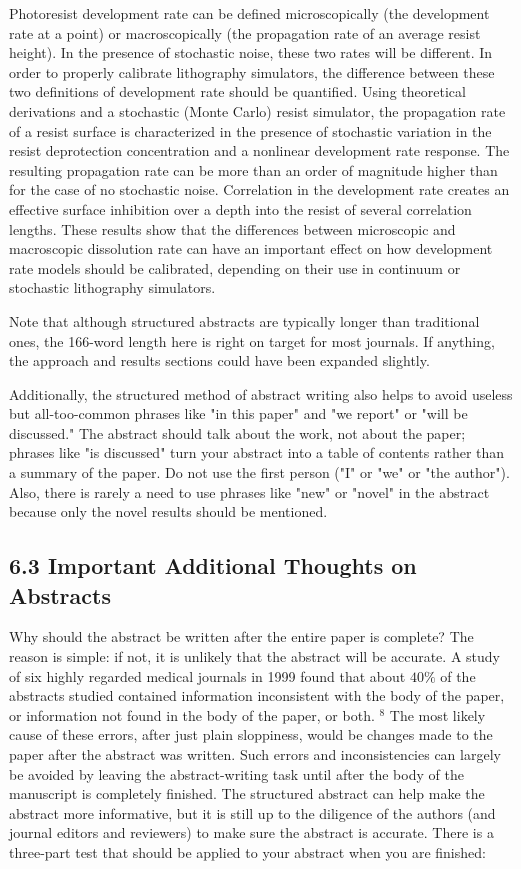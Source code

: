Photoresist development rate can be defined microscopically (the development rate at a point) or macroscopically (the propagation rate of an average resist height). In the presence of stochastic noise, these two rates will be different. In order to properly calibrate lithography simulators, the difference between these two definitions of development rate should be quantified. Using theoretical derivations and a stochastic (Monte Carlo) resist simulator, the propagation rate of a resist surface is characterized in the presence of stochastic variation in the resist deprotection concentration and a nonlinear development rate response. The resulting propagation rate can be more than an order of magnitude higher than for the case of no stochastic noise. Correlation in the development rate creates an effective surface inhibition over a depth into the resist of several correlation lengths. These results show that the differences between microscopic and macroscopic dissolution rate can have an important effect on how development rate models should be calibrated, depending on their use in continuum or stochastic lithography simulators.

Note that although structured abstracts are typically longer than traditional ones, the 166-word length here is right on target for most journals. If anything, the approach and results sections could have been expanded slightly.

Additionally, the structured method of abstract writing also helps to avoid useless but all-too-common phrases like "in this paper" and "we report" or "will be discussed." The abstract should talk about the work, not about the paper; phrases like "is discussed" turn your abstract into a table of contents rather than a summary of the paper. Do not use the first person ("I" or "we" or "the author"). Also, there is rarely a need to use phrases like "new" or "novel" in the abstract because only the novel results should be mentioned.

\subsection*{6.3 Important Additional Thoughts on Abstracts}
Why should the abstract be written after the entire paper is complete? The reason is simple: if not, it is unlikely that the abstract will be accurate. A study of six highly regarded medical journals in 1999 found that about $40 \%$ of the abstracts studied contained information inconsistent with the body of the paper, or information not found in the body of the paper, or both. ${ }^{8}$ The most likely cause of these errors, after just plain sloppiness, would be changes made to the paper after the abstract was written. Such errors and inconsistencies can largely be avoided by leaving the abstract-writing task until after the body of the manuscript is completely finished. The structured abstract can help make the abstract more informative, but it is still up to the diligence of the authors (and journal editors and reviewers) to make sure the abstract is accurate. There is a three-part test that should be applied to your abstract when you are finished:

